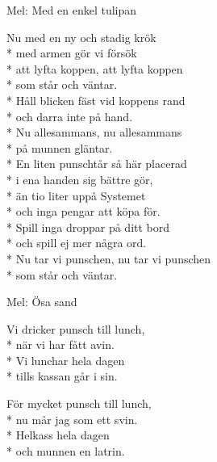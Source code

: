 \begin{SongText}[Födelsedagspunsch]
    \begin{SongInfo}
        Mel: Med en enkel tulipan
    \end{SongInfo}
    \begin{SongVerse}
        Nu med en ny och stadig krök\\*%
        med armen gör vi försök\\*%
        att lyfta koppen, att lyfta koppen\\*%
        som står och väntar.\\*%
        Håll blicken fäst vid koppens rand\\*%
        och darra inte på hand.\\*%
        Nu allesammans, nu allesammans\\*%
        på munnen gläntar.\\*%
        En liten punschtår så här placerad\\*%
        i ena handen sig bättre gör,\\*%
        än tio liter uppå Systemet\\*%
        och inga pengar att köpa för.\\*%
        Spill inga droppar på ditt bord\\*%
        och spill ej mer några ord.\\*%
        Nu tar vi punschen, nu tar vi punschen\\*%
        som står och väntar.
    \end{SongVerse}\end{SongText}
\begin{SongText}[Studiemedelsrundo]
    \begin{SongInfo}
        Mel: Ösa sand
    \end{SongInfo}
    \begin{SongVerse}
        Vi dricker punsch till lunch,\\*%
        när vi har fått avin.\\*%
        Vi lunchar hela dagen\\*%
        tills kassan går i sin.
    \end{SongVerse}
    \begin{SongVerse}
        För mycket punsch till lunch,\\*%
        nu mår jag som ett svin.\\*%
        Helkass hela dagen\\*%
        och munnen en latrin.
    \end{SongVerse}\end{SongText}
